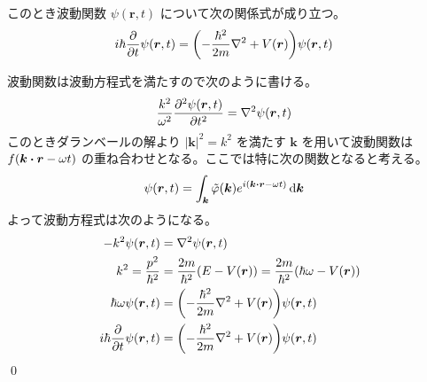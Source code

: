 \documentclass[uplatex,dvipdfmx,a4paper,11pt]{jlreq}
\makeatletter
\newcommand{\rr}{\bm{r}}
\newcommand{\kk}{\bm{k}}
\numberwithin{equation}{section}
\theoremstyle{definition}
\renewenvironment{proof}[1][\proofname]{\par
  \normalfont
  \topsep6\p@\@plus6\p@ \trivlist
  \item[\hskip\labelsep{\bfseries #1}\@addpunct{\bfseries}]\ignorespaces\quad\par
}{%
  \qed\endtrivlist\@endpefalse
}
\renewcommand\proofname{証明}
\makeatother
\begin{document}
\begin{theorem}
  このとき波動関数 $\psi(\rr, t)$ について次の関係式が成り立つ。
  \begin{align}
    i\hbar\pdv{t}\psi(\rr, t) & = \qty(-\frac{\hbar^2}{2m}\nabla^2 + V(\rr))\psi(\rr, t)
  \end{align}
\end{theorem}
\begin{proof}
  波動関数は波動方程式を満たすので次のように書ける。
  \begin{align}
    \frac{k^2}{\omega^2}\pdv[2]{\psi(\rr, t)}{t} & = \nabla^2\psi(\rr, t)
  \end{align}
  このときダランベールの解より $|\kk|^2 = k^2$ を満たす $\kk$ を用いて波動関数は $f(\kk\vdot\rr - \omega t)$ の重ね合わせとなる。ここでは特に次の関数となると考える。
  \begin{align}
    \psi(\rr, t) & = \int_{\kk}\tilde{\varphi}(\kk)e^{i(\kk\vdot\rr - \omega t)}\dd{\kk}
  \end{align}
  よって波動方程式は次のようになる。
  \begin{align}
    -k^2\psi(\rr, t)          & = \nabla^2\psi(\rr, t)                                                      \\
    k^2 = \frac{p^2}{\hbar^2} & = \frac{2m}{\hbar^2}(E - V(\rr)) = \frac{2m}{\hbar^2}(\hbar\omega - V(\rr)) \\
    \hbar\omega\psi(\rr, t)   & = \qty(-\frac{\hbar^2}{2m}\nabla^2 + V(\rr))\psi(\rr, t)                    \\
    i\hbar\pdv{t}\psi(\rr, t) & = \qty(-\frac{\hbar^2}{2m}\nabla^2 + V(\rr))\psi(\rr, t)
  \end{align}
\end{proof}
\end{document}
